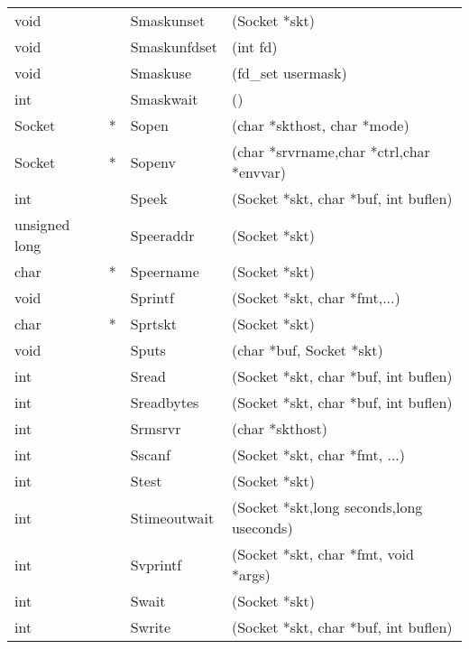 \documentclass[12pt]{article}
\begin{document}
\begin{center}
\begin{tabular}{||ll|l|l||}
  void          &   & Smaskunset     & (Socket *skt)                            \\
  void          &   & Smaskunfdset   & (int fd)                                 \\
  void          &   & Smaskuse       & (fd\_set usermask)                       \\
  int           &   & Smaskwait      & ()                                       \\
  Socket        & * & Sopen          & (char *skthost, char *mode)              \\
  Socket        & * & Sopenv         & (char *srvrname,char *ctrl,char *envvar) \\
  int           &   & Speek          & (Socket *skt, char *buf, int buflen)     \\
  unsigned long &   & Speeraddr      & (Socket *skt)                            \\
  char          & * & Speername      & (Socket *skt)                            \\
  void          &   & Sprintf        & (Socket *skt, char *fmt,...)             \\
  char          & * & Sprtskt        & (Socket *skt)                            \\
  void          &   & Sputs          & (char *buf, Socket *skt)                 \\
  int           &   & Sread          & (Socket *skt, char *buf, int buflen)     \\
  int           &   & Sreadbytes     & (Socket *skt, char *buf, int buflen)     \\
  int           &   & Srmsrvr        & (char *skthost)                          \\
  int           &   & Sscanf         & (Socket *skt, char *fmt, ...)            \\
  int           &   & Stest          & (Socket *skt)                            \\
  int           &   & Stimeoutwait   & (Socket *skt,long seconds,long useconds) \\
  int           &   & Svprintf       & (Socket *skt, char *fmt, void *args)     \\
  int           &   & Swait          & (Socket *skt)                            \\
  int           &   & Swrite         & (Socket *skt, char *buf, int buflen)     \\
  \hline\hline
  \end{tabular}
\end{center}
\end{document}
